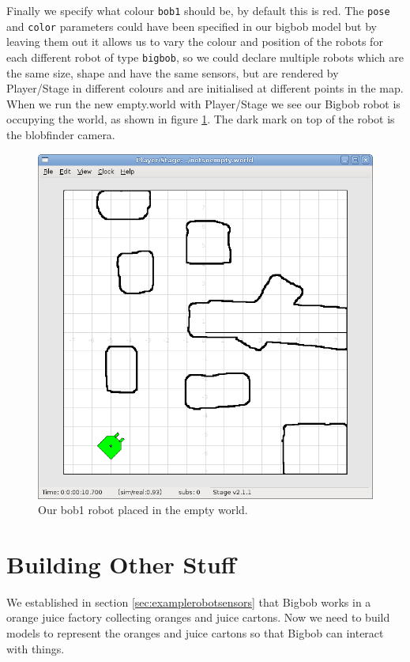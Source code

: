 \documentclass[a4paper]{report}
\newcommand{\plst}{Player/Stage\xspace}
\begin{document}
Finally we specify what colour \verb|bob1| should be, by default this is red. The \verb|pose| and \verb|color| parameters could have been specified in our bigbob model but by leaving them out it allows us to vary the colour and position of the robots for each different robot of type \verb|bigbob|, so we could declare multiple robots which are the same size, shape and have the same sensors, but are rendered by \plst in different colours and are initialised at different points in the map.\newline
When we run the new empty.world with \plst we see our Bigbob robot is occupying the world, as shown in figure \ref{fig:finalRobotBuild}. The dark mark on top of the robot is the blobfinder camera.

\begin{figure}
	\centering
	\includegraphics[width=0.7\linewidth]{./pics/robot_building/final_robot_build.png} 
	\caption{Our bob1 robot placed in the empty world.}
	\label{fig:finalRobotBuild}
\end{figure}


\section{Building Other Stuff} \label{sec:otherStuff}
We established in section \ref{sec:examplerobotsensors} that Bigbob works in a orange juice factory collecting oranges and juice cartons. Now we need to build models to represent the oranges and juice cartons so that Bigbob can interact with things.
\end{document}
